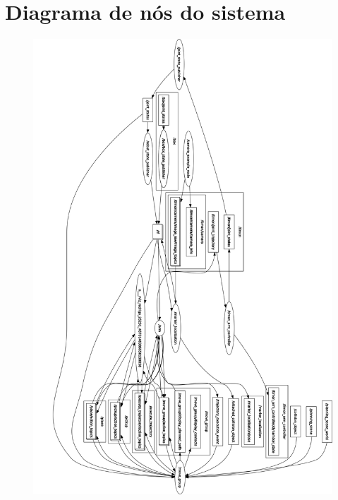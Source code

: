 \documentclass[
12pt,					%
openright,				%
twoside,				%
a4paper,				%
english,
brazil
]{ABNT/abntex2_report}
\begin{document}
	\chapter{Diagrama de nós do sistema}
	\label{apend:rqt}
	\begin{figure}[H]
		\centering
		\includegraphics[scale=0.2]{appendix/rosgraph.png}
	\end{figure}

	
\end{document}
